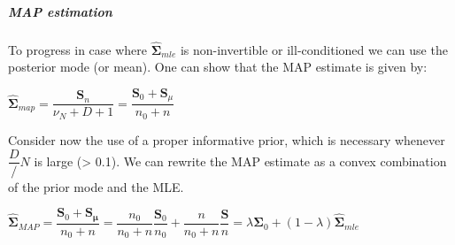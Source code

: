 
 \subparagraph{MAP estimation}
 To progress in case where $\hat{\bm{\Sigma}}_{mle}$ is non-invertible or ill-conditioned
 we can use the posterior mode (or mean). One can show that the MAP estimate is given by:
 \begin{center}
     $\hat{\bm{\Sigma}}_{map} = \dfrac{\bm{S}_{n}}{\nu_{N} + D + 1} = \dfrac{\bm{S}_{0} +
     \bm{S}_{\mu}}{n_{0} + n}$
 \end{center}
 Consider now the use of a proper informative prior, which is necessary whenever 
 $\dfrac{D}/{N}$ is large (> 0.1). We can rewrite the MAP estimate as a convex combination
 of the prior mode and the MLE.
 \begin{center}
     $\hat{\bm{\Sigma}}_{MAP} = \dfrac{\bm{S}_{0} + \bm{S}_{\bm{\mu}}}{n_{0} + n} = 
     \dfrac{n_{0}}{n_{0}+n}\dfrac{\bm{S}_{0}}{n_{0}} + \dfrac{n}{n_{0} + n}\dfrac{\bm{S}}
     {n} = \lambda\bm{\Sigma}_{0} + (1-\lambda)\hat{\bm{\Sigma}}_{mle}$
 \end{center}

